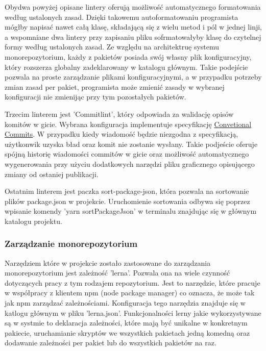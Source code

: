 Obydwa powyżej opisane lintery oferują możliwość automatycznego formatowania według ustalonych zasad. Dzięki takowemu autoformatowaniu programista mógłby napisać nawet całą klasę, składającą się z wielu metod i pól w jednej linji, a wspomniane dwa lintery przy zapisaniu pliku sofrmatowałyby klasę do czytelnej formy według ustalonych zasad. Ze względu na architektruę systemu monorepozytorium, każdy z pakietów posiada swój własny plik konfiguracyjny, który rozszerza globalny zadeklarowany w katalogu głównym. Takie podejście pozwala na proste zarządzanie plikami konfiguracyjnymi, a w przypadku potrzeby zmian zasad per pakiet, programista może zmienić zasady w wybranej konfiguracji nie zmienijąc przy tym pozostałych pakietów.

Trzecim linterem jest 'Commitlint', który odpowiada za walidację opisów komitów w gicie. Wybrana konfiguracja implementuje specyfikację \href{https://www.conventionalcommits.org/en/v1.0.0/#specification}{Convetional Commits}. W przypadku kiedy wiadomość będzie niezgodna z specyfikacją, użytkonwik uzyska bład oraz komit nie zostanie wysłany. Takie podjeście oferuje spójną historię wiadomości commitów w gicie oraz możliwość automatycznego wygenerowania przy użyciu dodatkowych narzędzi pliku graficznego opisującego zmiany od ostaniej publikacji.

Ostatnim linterem jest paczka sort-package-json, która pozwala na sortowanie plików package.json w projekcie. Uruchomienie sortowania odbywa się poprzez wpisanie komendy 'yarn sortPackageJson' w terminalu znajdując się w głównym katalogu projektu. 

\subsubsection{Zarządzanie monorepozytorium}
Narzędziem które w projekcie zostało zastosowane do zarządzania monorepozytorium jest zależność 'lerna'. Pozwala ona na wiele czynność dotyczących pracy z tym rodzajem repozytorium. Jest to narzędzie, które pracuje w współpracy z klientem npm (node package manager) co oznacza, że może tak jak npm zarządzać zależnościami. Konfiguracja tego narzędzia znajduje się w katlogu głównym w pliku 'lerna.json'. Funkcjonalności lerny jakie wykorzystywane są w systmie to deklaracja zależności, które mają być unikalne w konkretnym pakiecie, uruchamianie skryptów we wszystkich pakietach jedną komedną oraz dodawanie zależności per pakiet lub do wszystkich pakietów na raz.

